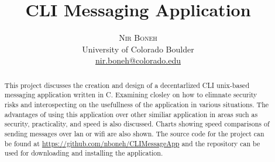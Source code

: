 \documentclass[twoside]{article}
\title{\vspace{-15mm}\fontsize{24pt}{10pt}\selectfont\textbf{CLI Messaging Application}} %
\author{
\large
\textsc{Nir Boneh}\\[2mm] %
\normalsize University of Colorado Boulder \\ %
\normalsize \href{mailto:nir.boneh@colorado.edu}{nir.boneh@colorado.edu} \\ %
\vspace{-5mm}
}
\date{}
\begin{document}
\maketitle %

\thispagestyle{fancy} %


\begin{abstract}

\noindent
This project discusses the creation and design of a decentarlized CLI unix-based messaging application written in C. Examining 
closley on how to elimnate security risks and interospecting on the usefullness of the application in various situations. The 
advantages of using this application over other similiar application in areas such as security, practicality, and speed is also 
discussed. Charts showing speed comparisons of sending messages over lan or wifi are also shown. The source code for the project can be found at \href{https://github.com/nboneh/CLIMessageApp}{https://github.com/nboneh/CLIMessageApp} and the repository can be used for downloading and installing the application.

\end{abstract}

\end{document}
